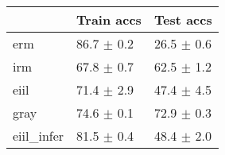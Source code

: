 \begin{tabular}{lll}
\toprule
{} &      Train accs &       Test accs \\
\midrule
erm        &  86.7 $\pm$ 0.2 &  26.5 $\pm$ 0.6 \\
irm        &  67.8 $\pm$ 0.7 &  62.5 $\pm$ 1.2 \\
eiil       &  71.4 $\pm$ 2.9 &  47.4 $\pm$ 4.5 \\
gray       &  74.6 $\pm$ 0.1 &  72.9 $\pm$ 0.3 \\
eiil_infer &  81.5 $\pm$ 0.4 &  48.4 $\pm$ 2.0 \\
\bottomrule
\end{tabular}

